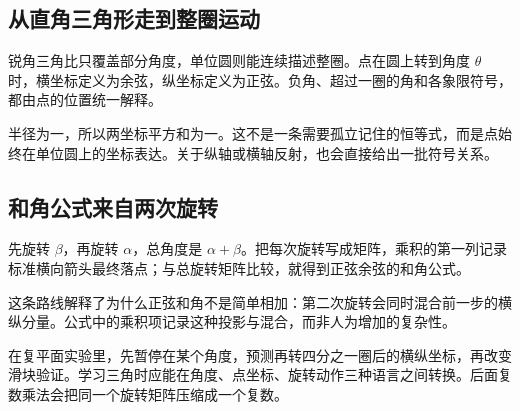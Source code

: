 \subsection*{从直角三角形走到整圈运动}
锐角三角比只覆盖部分角度，单位圆则能连续描述整圈。点在圆上转到角度 $\theta$ 时，横坐标定义为余弦，纵坐标定义为正弦。负角、超过一圈的角和各象限符号，都由点的位置统一解释。

半径为一，所以两坐标平方和为一。这不是一条需要孤立记住的恒等式，而是点始终在单位圆上的坐标表达。关于纵轴或横轴反射，也会直接给出一批符号关系。

\subsection*{和角公式来自两次旋转}
先旋转 $\beta$，再旋转 $\alpha$，总角度是 $\alpha+\beta$。把每次旋转写成矩阵，乘积的第一列记录标准横向箭头最终落点；与总旋转矩阵比较，就得到正弦余弦的和角公式。

这条路线解释了为什么正弦和角不是简单相加：第二次旋转会同时混合前一步的横纵分量。公式中的乘积项记录这种投影与混合，而非人为增加的复杂性。

在复平面实验里，先暂停在某个角度，预测再转四分之一圈后的横纵坐标，再改变滑块验证。学习三角时应能在角度、点坐标、旋转动作三种语言之间转换。后面复数乘法会把同一个旋转矩阵压缩成一个复数。
